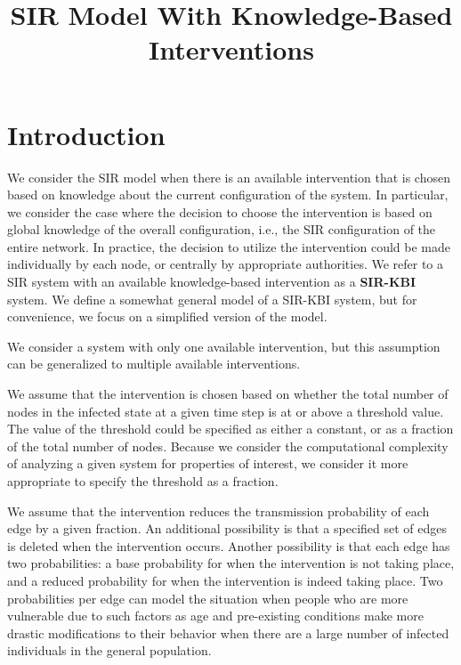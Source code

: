 \documentclass[11pt]{article}
\title{\textbf{SIR Model With Knowledge-Based Interventions}}
\author{  
\vspace*{1ex}  
}
\begin{document}
 
 
\maketitle  
 
\normalbaselineskip

\section{Introduction}
\label{sec:introduction}
  
  We consider the SIR model when there is an available intervention 
  that is chosen based on 
  knowledge about the current configuration of the system.
  In particular, we consider the case where the decision to choose the intervention is based on 
  global knowledge of the overall configuration,
  i.e., the SIR configuration of the entire network.
  In practice, the decision to utilize the intervention could be made individually by each node,
  or centrally by appropriate authorities.
We refer to a SIR system with an available knowledge-based intervention 
as a {\bf SIR-KBI} system.
We define a somewhat general model of a SIR-KBI system,
but for convenience, we focus on a simplified version of the model.

  We consider a system with only one available intervention, 
  but this assumption can be generalized to multiple available interventions.
  
  We assume that the intervention is chosen based on whether the total number of nodes 
  in the infected state at a given time step is at or above a threshold value.
  The value of the threshold could be specified as either a constant,
  or as a fraction of the total number of nodes.
  Because we consider the computational complexity of analyzing a given system for properties of interest,
  we consider it more appropriate to specify the threshold as a fraction.
  
    We assume that the intervention reduces the transmission probability of each edge by a given fraction.
  An additional possibility is that a specified set of edges is deleted when the intervention occurs.
  Another possibility is that each edge has two probabilities:
  a base probability for when the intervention is not taking place,
  and a reduced probability for when the intervention is indeed taking place.
  Two probabilities per edge can model the situation when people who are more vulnerable 
  due to such factors as age and pre-existing conditions
  make more drastic modifications to their behavior when 
  there are a large number of infected individuals in the general population.
 
\end{document}
